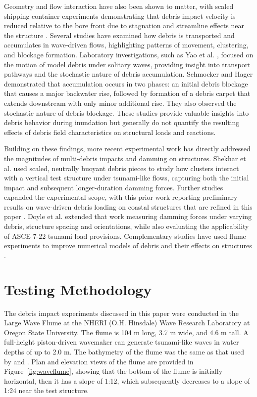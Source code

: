 \documentclass[10pt,a4paper]{article}
\begin{document}
Geometry and flow interaction have also been shown to matter, with scaled shipping container experiments demonstrating that debris impact velocity is reduced relative to the bore front due to stagnation and streamline effects near the structure \citep{Derschum2018}. Several studies have examined how debris is transported and accumulates in wave-driven flows, highlighting patterns of movement, clustering, and blockage formation. Laboratory investigations, such as Yao et al. \citep{Yao2014}, focused on the motion of model debris under solitary waves, providing insight into transport pathways and the stochastic nature of debris accumulation. Schmocker and Hager \citep{Schmocker2011}  demonstrated that accumulation occurs in two phases: an initial debris blockage that causes a major backwater rise, followed by formation of a debris carpet that extends downstream with only minor additional rise. They also observed the stochastic nature of debris blockage. These studies provide valuable insights into debris behavior during inundation but generally do not quantify the resulting effects of debris field characteristics on structural loads and reactions.

Building on these findings, more recent experimental work has directly addressed the magnitudes of
multi-debris impacts and damming on structures. Shekhar et al. \citep{Shekhar2020} used scaled, neutrally buoyant debris pieces to study how  clusters interact with a vertical test structure under tsunami-like flows, capturing both the initial impact and subsequent longer-duration damming forces. Further studies expanded the experimental scope, with this prior work reporting preliminary results on wave-driven debris loading on coastal structures that are refined in this paper \citep{Mascarenas2022}. Doyle et al. \citep{Doyle2025} extended that work measuring damming forces under varying debris, structure spacing and orientations, while also evaluating the applicability of ASCE 7-22 tsunami load provisions. Complementary studies have used flume experiments to improve numerical models of debris and their effects on structures \citep{Bonus2022, bonusTsunamiDebrisMotion2025}. 



\section{Testing Methodology}
The debris impact experiments discussed in this paper were conducted in the Large Wave Flume at the NHERI (O.H. Hinsdale) Wave Research Laboratory at Oregon State University. The flume is 104 m long, 3.7 m wide, and 4.6 m tall. A full-height piston-driven wavemaker can generate tsunami-like waves in water depths of up to 2.0 m. The bathymetry of the flume was the same as that used by \citep{winterTsunamiLikeWaveForces2020} and \citep{Shekhar2020}. Plan and elevation views of the flume are provided in Figure~\ref{fig:waveflume}, showing that the bottom of the flume is initially horizontal, then it has a slope of 1:12, which subsequently decreases to a slope of 1:24 near the test structure. 
 
\end{document}
